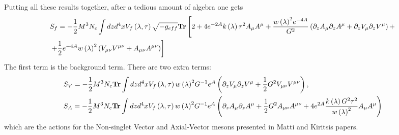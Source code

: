 \documentclass[10 pt]{article}
\begin{document}
Putting all these results together, after a tedious amount of algebra one gets
\begin{align}
&S_f = - \frac{1}{2} M^3 N_c \int dz d^4 x V_f \left(\lambda, \tau \right) \sqrt{- g_{eff}} \bold{Tr} \left[ 2 + 4 e^{-2A} k\left( \lambda \right) \tau^2 A_\mu A^\mu + \frac{{w\left(\lambda\right)}^2 e^{-4A}}{G^2} \left( \partial_z A_\mu \partial_z A^\mu +  \partial_z V_\mu \partial_z V^\mu \right) + \right. \\
&\left. + \frac{1}{2} e^{-4A} {w\left(\lambda\right)}^2 \left( V_{\mu \nu}V^{\mu \nu} + A_{\mu \nu} A^{\mu \nu} \right) \right]
\end{align}
The first term is the background term. There are two extra terms:
\begin{align}
\label{eq:VM_action}
&S_V = - \frac{1}{2} M^3 N_c \bold{Tr} \int dz d^4x V_{f} \left( \lambda, \tau \right) {w\left(\lambda\right)}^2 G^{-1} e^{A} \left( \partial_z V_\mu \partial_z V^\mu + \frac{1}{2} G^2 V_{\mu \nu} V^{\mu \nu} \right), \\
& S_A = - \frac{1}{2} M^3 N_c \bold{Tr} \int dz d^4 x V_{f} \left( \lambda, \tau \right) {w\left(\lambda\right)}^2 G^{-1} e^{A} \left( \partial_z A_\mu \partial_z A^\mu + \frac{1}{2} G^2 A_{\mu \nu} A^{\mu \nu} + 4 e^{2A} \frac{k\left(\lambda\right) G^2 \tau^2}{{w\left(\lambda\right)}^2} A_\mu A^\mu \right)
\end{align}
which are the actions for the Non-singlet Vector and Axial-Vector mesons presented in Matti and Kiritsis papers.
\end{document}
